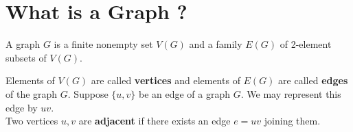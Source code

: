 

\section{What is a Graph ?}
\begin{definition}[graph]
	A graph $G$ is a finite nonempty set $V(G)$ and a family $E(G)$ of 2-element subsets of $V(G)$.
\end{definition}

\begin{remark}
	Elements of $V(G)$ are called \textbf{vertices} and elements of $E(G)$ are called \textbf{edges} of the graph $G$.
	Suppose $\{u,v\}$ be an edge of a graph $G$. We may represent this edge by $uv$.\\

	Two vertices $u,v$ are \textbf{adjacent} if there exists an edge $e = uv$ joining them.
\end{remark}

